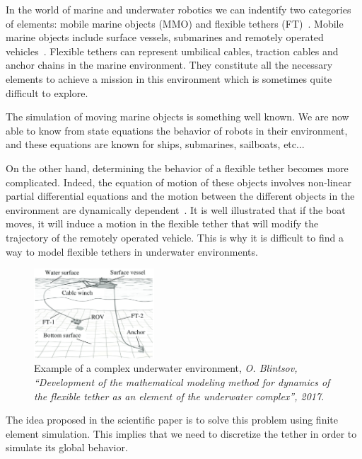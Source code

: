 In the world of marine and underwater robotics we can indentify two categories of elements: mobile marine objects (MMO) and flexible tethers (FT)~\cite{fossen2011handbook,blintsov_development_2017}. Mobile marine objects include surface vessels, submarines and remotely operated vehicles~\cite{jaulin2019mobile}. Flexible tethers can represent umbilical cables, traction cables and anchor chains in the marine environment. They constitute all the necessary elements to achieve a mission in this environment which is sometimes quite difficult to explore.

The simulation of moving marine objects is something well known. We are now able to know from state equations the behavior of robots in their environment, and these equations are known for ships, submarines, sailboats, etc...~\cite{fossen2011handbook, jaulin2019mobile}

On the other hand, determining the behavior of a flexible tether becomes more complicated. Indeed, the equation of motion of these objects involves non-linear partial differential equations and the motion between the different objects in the environment are dynamically dependent~\cite{blintsov_development_2017}. It is well illustrated that if the boat moves, it will induce a motion in the flexible tether that will modify the trajectory of the remotely operated vehicle. This is why it is difficult to find a way to model flexible tethers in underwater environments.

\begin{figure}[!htb]
	\centering
	\includegraphics[width=0.4\textwidth]{imgs/underwater_environment.png}
	\caption{Example of a complex underwater environment, \textit{O.  Blintsov,  “Development  of  the  mathematical  modeling  method  for dynamics of the flexible tether as an element of the underwater complex”, 2017}.~\cite{blintsov_development_2017}}
	\label{fig:underwater_environment}
\end{figure}

The idea proposed in the scientific paper is to solve this problem using finite element simulation. This implies that we need to discretize the tether in order to simulate its global behavior.